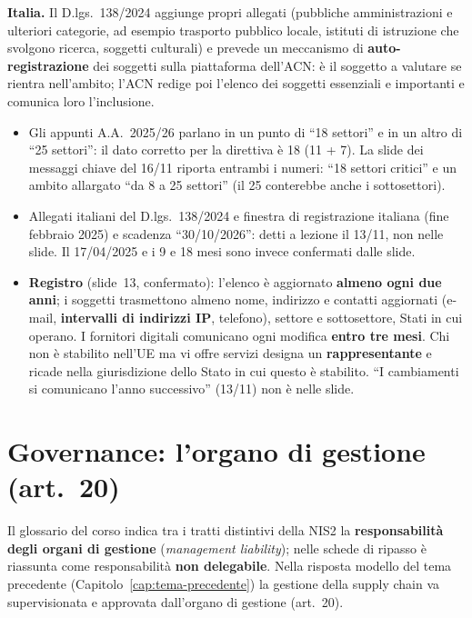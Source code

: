 \begin{integrazione}
\medskip
\textbf{Italia.} Il D.lgs.~138/2024 aggiunge propri allegati (pubbliche amministrazioni e ulteriori
categorie, ad esempio trasporto pubblico locale, istituti di istruzione che svolgono ricerca, soggetti
culturali) e prevede un meccanismo di \textbf{auto-registrazione} dei soggetti sulla piattaforma
dell'ACN: è il soggetto a valutare se rientra nell'ambito; l'ACN redige poi l'elenco dei soggetti
essenziali e importanti e comunica loro l'inclusione.
\end{integrazione}

\begin{verifica}
\begin{itemize}
  \item Gli appunti A.A.~2025/26 parlano in un punto di ``18 settori'' e in un altro di ``25 settori'':
    il dato corretto per la direttiva è 18 (11 + 7). La slide dei messaggi chiave del 16/11 riporta
    entrambi i numeri: ``18 settori critici'' e un ambito allargato ``da 8 a 25 settori'' (il 25
    conterebbe anche i sottosettori).
  \item Allegati italiani del D.lgs.~138/2024 e finestra di registrazione italiana (fine febbraio 2025)
    e scadenza ``30/10/2026'': detti a lezione il 13/11, non nelle slide. Il 17/04/2025 e i 9 e 18 mesi
    sono invece confermati dalle slide.
  \item \textbf{Registro} (slide~13, confermato): l'elenco è aggiornato \textbf{almeno ogni due anni}; i
    soggetti trasmettono almeno nome, indirizzo e contatti aggiornati (e-mail, \textbf{intervalli di
    indirizzi IP}, telefono), settore e sottosettore, Stati in cui operano. I fornitori digitali
    comunicano ogni modifica \textbf{entro tre mesi}. Chi non è stabilito nell'UE ma vi offre servizi
    designa un \textbf{rappresentante} e ricade nella giurisdizione dello Stato in cui questo è stabilito.
    ``I cambiamenti si comunicano l'anno successivo'' (13/11) non è nelle slide.
\end{itemize}
\end{verifica}

\section{Governance: l'organo di gestione (art.~20)}
\label{sec:nis2-governance}

Il glossario del corso indica tra i tratti distintivi della NIS2 la \textbf{responsabilità degli
organi di gestione} (\emph{management liability}); nelle schede di ripasso è riassunta come
responsabilità \textbf{non delegabile}. Nella risposta modello del tema precedente
(Capitolo~\ref{cap:tema-precedente}) la gestione della supply chain va supervisionata e approvata
dall'organo di gestione (art.~20).

